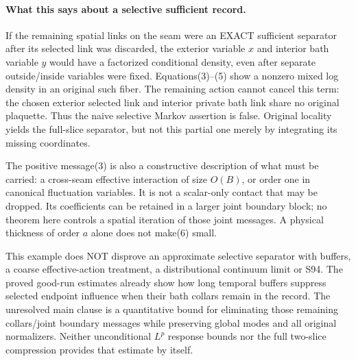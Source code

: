 \documentclass[11pt]{article}
\begin{document}
\paragraph{What this says about a selective sufficient record.}
If the remaining spatial links on the seam were an EXACT sufficient separator
after its selected link was discarded, the exterior variable $x$ and interior
bath variable $y$ would have a factorized conditional density, even after
separate outside/inside variables were fixed. Equations(3)--(5) show a nonzero
mixed log density in an original such fiber. The remaining action cannot cancel
this term: the chosen exterior selected link and interior private bath link
share no original plaquette. Thus the naive selective Markov assertion is
false. Original locality yields the full-slice separator, but not this partial
one merely by integrating its missing coordinates.

The positive message(3) is also a constructive description of what must be
carried: a cross-seam effective interaction of size $O(B)$, or order one in
canonical fluctuation variables. It is not a scalar-only contact that may be
dropped. Its coefficients can be retained in a larger joint boundary block;
no theorem here controls a spatial iteration of those joint messages. A
physical thickness of order $a$ alone does not make(6) small.

This example does NOT disprove an approximate selective separator with buffers,
a coarse effective-action treatment, a distributional continuum limit or S94.
The proved good-run estimates already show how long temporal buffers suppress
selected endpoint influence when their bath collars remain in the record.
The unresolved main clause is a quantitative bound for eliminating those
remaining collars/joint boundary messages while preserving global modes and
all original normalizers. Neither unconditional $L^p$ response bounds nor the
full two-slice compression provides that estimate by itself.
\end{document}

